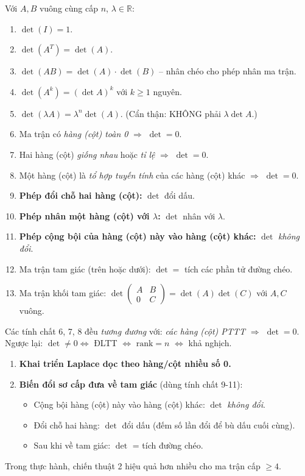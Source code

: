 \documentclass[12pt,a4paper]{article}
\begin{document}
\begin{dinhly}[title={Tính chất $\det$}]
Với $A, B$ vuông cùng cấp $n$, $\lambda \in \mathbb{R}$:
\begin{enumerate}
  \item $\det(I) = 1$.
  \item $\det(A^T) = \det(A)$.
  \item $\det(AB) = \det(A)\cdot \det(B)$ -- nhân chéo cho phép nhân ma trận.
  \item $\det(A^k) = (\det A)^k$ với $k \ge 1$ nguyên.
  \item $\det(\lambda A) = \lambda^n \det(A)$. (Cẩn thận: KHÔNG phải $\lambda \det A$.)
  \item Ma trận có \emph{hàng (cột) toàn 0} $\Rightarrow$ $\det = 0$.
  \item Hai hàng (cột) \emph{giống nhau} hoặc \emph{tỉ lệ} $\Rightarrow$ $\det = 0$.
  \item Một hàng (cột) là \emph{tổ hợp tuyến tính} của các hàng (cột) khác $\Rightarrow$ $\det = 0$.
  \item \textbf{Phép đổi chỗ hai hàng (cột):} $\det$ đổi dấu.
  \item \textbf{Phép nhân một hàng (cột) với $\lambda$:} $\det$ nhân với $\lambda$.
  \item \textbf{Phép cộng bội của hàng (cột) này vào hàng (cột) khác:} $\det$ \emph{không đổi}.
  \item Ma trận tam giác (trên hoặc dưới): $\det = $ tích các phần tử đường chéo.
  \item Ma trận khối tam giác: $\det\begin{pmatrix}A & B\\ 0 & C\end{pmatrix} = \det(A)\det(C)$ với $A, C$ vuông.
\end{enumerate}
\end{dinhly}

\begin{ynghia}
Các tính chất 6, 7, 8 đều \emph{tương đương} với: \emph{các hàng (cột) PTTT $\Rightarrow$ $\det = 0$}. Ngược lại: $\det \ne 0 \Leftrightarrow$ ĐLTT $\Leftrightarrow$ $\mathrm{rank} = n$ $\Leftrightarrow$ khả nghịch.
\end{ynghia}

\begin{phuongphap}[title={Tính định thức cao cấp -- Hai chiến thuật}]
\begin{enumerate}
  \item \textbf{Khai triển Laplace dọc theo hàng/cột nhiều số 0.}
  \item \textbf{Biến đổi sơ cấp đưa về tam giác} (dùng tính chất 9-11):
  \begin{itemize}
    \item Cộng bội hàng (cột) này vào hàng (cột) khác: $\det$ \emph{không đổi}.
    \item Đổi chỗ hai hàng: $\det$ đổi dấu (đếm số lần đổi để bù dấu cuối cùng).
    \item Sau khi về tam giác: $\det$ = tích đường chéo.
  \end{itemize}
\end{enumerate}
Trong thực hành, chiến thuật 2 hiệu quả hơn nhiều cho ma trận cấp $\ge 4$.
\end{phuongphap}
\end{document}
